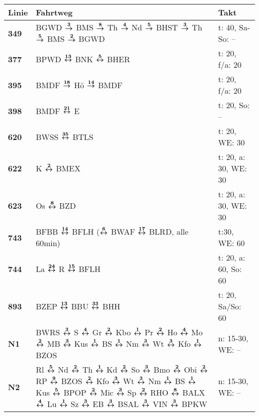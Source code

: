 \begin{minipage}[t]{0.45\textwidth}
\begin{tabular}{>{\bfseries}L{1.2cm}L{9.0cm}L{3.0cm}}
{\bfseries Linie} & {\bfseries Fahrtweg} & {\bfseries Takt} \\
\hline
\bus{} 349    & BGWD $\xarre{3}$ BMS $\xarre{8}$ Th $\xarre{4}$ Nd $\xarre{5}$ BHST $\xarre{3}$ Th $\xarre{5}$ BMS $\xarre{2}$ BGWD
& t: 40, Sa-So: --           \\
\bus{} 377    & BPWD $\xarwe{13}$ BNK $\xarwe{5}$ BHER                                                                                                                              & t: 20, f/a: 20             \\
\bus{} 395    & BMDF $\xarre{18}$ Hö $\xarre{14}$ BMDF                                                                                                                              & t: 20, f/a: 20             \\
\bus{} 398    & BMDF $\xarwe{21}$ E
& t: 20, So: --              \\
\bus{} 620    & BWSS $\xarwe{35}$ BTLS   & t: 20, WE: 30 \\
\bus{} 622    & K $\xarwe{2}$ BMEX       & t: 20, a: 30, WE: 30 \\
\bus{} 623    & Os $\xarwe{8}$ BZD       & t: 20, a: 30, WE: 30 \\
\bus{} 743    & BFBB $\xarwe{14}$ BFLH ($\xarwe{6}$ BWAF $\xarwe{17}$ BLRD, alle 60min) & t:30, WE: 60 \\
\bus{} 744    & La $\xarwe{24}$ R $\xarwe{15}$ BFLH & t: 20, a: 60, So: 60 \\
\bus{} 893    & BZEP $\xarwe{13}$ BBU $\xarwe{33}$ BHH                                                                                                                              & t: 20, Sa/So: 60           \\
\nbus{} N1    & BWRS $\xarwe{3}$ S $\xarwe{4}$ Gr $\xarwe{2}$ Kbo $\xarwe{1}$ Pr $\xarwe{2}$ Ho $\xarwe{4}$ Mo $\xarwe{2}$ MB $\xarwe{3}$ Kus $\xarwe{1}$ BS $\xarwe{1}$ Nm         %
                $\xarwe{3}$ Wt $\xarwe{3}$ Kfo $\xarwe{1}$ BZOS                                                                                                                     & n: 15-30, WE: --           \\
\nbus{} N2    & Rl $\xarwe{5}$ Nd $\xarwe{2}$ Th $\xarwe{1}$ Kd $\xarwe{2}$ So $\xarwe{3}$ Bmo $\xarwe{2}$ Obi $\xarwe{2}$ RP $\xarwe{9}$ BZOS $\xarwe{2}$ Kfo $\xarwe{3}$ Wt       %
                $\xarwe{3}$ Nm $\xarwe{1}$ BS $\xarwe{1}$ Kus $\xarwe{5}$ BPOP $\xarwe{2}$ Mic $\xarwe{3}$ Sp $\xarwe{2}$ RHO $\xarwe{8}$ BALX $\xarwe{4}$ Lu%
                $\xarwe{1}$ Sz $\xarwe{3}$ EB $\xarwe{3}$ BSAL $\xarwe{3}$ VIN $\xarwe{3}$ BPKW                                                                                     & n: 15-30, WE: --           \\
\hline
\end{tabular}
\end{minipage}
\begin{minipage}[t]{0.05\textwidth}
\phantom{Tor}
\end{minipage}

